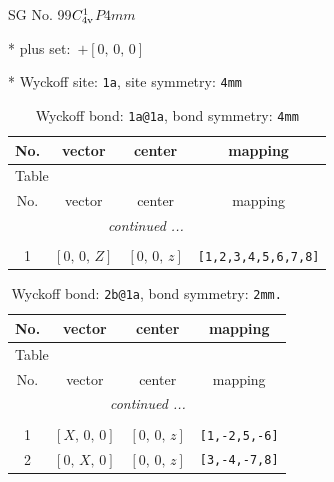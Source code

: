 \documentclass[fleqn,8pt]{jsarticle}
\begin{document}
\setcounter{MaxMatrixCols}{32}

\renewcommand{\tablename}{Table~}
\renewcommand{\figurename}{Figure~}
\begin{center}
\LARGE
SG No. 99\quad$C_{\rm 4v}^{1}$\quad$P4mm$\quad[ tetragonal ]
\end{center}

* plus set:\,\,\,$+\left[ 0,\, 0,\, 0 \right]$


* Wyckoff site: {\tt 1a}, site symmetry: {\tt 4mm}
\renewcommand{\arraystretch}{1.2}
\begin{longtable}{cccc}
\caption{Wyckoff bond: {\tt 1a@1a}, bond symmetry: {\tt 4mm}}
 \\
 \hline \hline
No. & vector & center & mapping \\ \hline \endfirsthead

\multicolumn{3}{l}{\tablename\ \thetable{}} \\
 \hline \hline
No. & vector & center & mapping \\ \hline \endhead

 \hline \hline
\multicolumn{3}{r}{\footnotesize\it continued ...} \\ \endfoot

 \hline \hline
\multicolumn{3}{r}{} \\ \endlastfoot

1 & $\left[ 0,\, 0,\, Z \right]$ & $\left[ 0,\, 0,\, z \right]$ & {\tt [1,2,3,4,5,6,7,8]} \\
\end{longtable}
\renewcommand{\arraystretch}{1.2}
\begin{longtable}{cccc}
\caption{Wyckoff bond: {\tt 2b@1a}, bond symmetry: {\tt 2mm.}}
 \\
 \hline \hline
No. & vector & center & mapping \\ \hline \endfirsthead

\multicolumn{3}{l}{\tablename\ \thetable{}} \\
 \hline \hline
No. & vector & center & mapping \\ \hline \endhead

 \hline \hline
\multicolumn{3}{r}{\footnotesize\it continued ...} \\ \endfoot

 \hline \hline
\multicolumn{3}{r}{} \\ \endlastfoot

1 & $\left[ X,\, 0,\, 0 \right]$ & $\left[ 0,\, 0,\, z \right]$ & {\tt [1,-2,5,-6]} \\ \hline
2 & $\left[ 0,\, X,\, 0 \right]$ & $\left[ 0,\, 0,\, z \right]$ & {\tt [3,-4,-7,8]} \\
\end{longtable}
\end{document}
